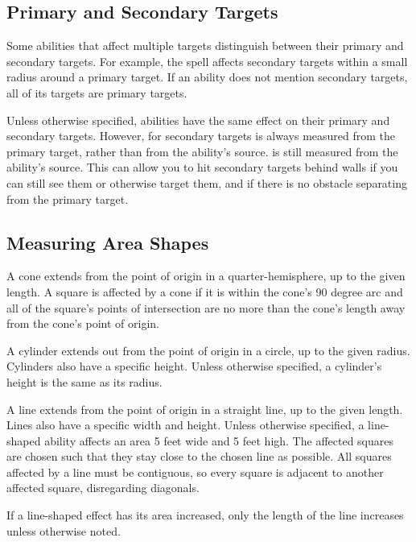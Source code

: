   \subsection{Primary and Secondary Targets}\label{Primary and Secondary Targets}
    Some abilities that affect multiple targets distinguish between their primary and secondary targets.
    For example, the  spell affects secondary targets within a small radius around a primary target.
    If an ability does not mention secondary targets, all of its targets are primary targets.

    Unless otherwise specified, abilities have the same effect on their primary and secondary targets.
    However,  for secondary targets is always measured from the primary target, rather than from the ability's source.
     is still measured from the ability's source.
    This can allow you to hit secondary targets behind walls if you can still see them or otherwise target them, and if there is no obstacle separating from the primary target.

  \subsection{Measuring Area Shapes}\label{Area Shapes}

     A cone extends from the point of origin in a quarter-hemisphere, up to the given length.
    A square is affected by a cone if it is within the cone's 90 degree arc and all of the square's points of intersection are no more than the cone's length away from the cone's point of origin.

     A cylinder extends out from the point of origin in a circle, up to the given radius.
    Cylinders also have a specific height.
    Unless otherwise specified, a cylinder's height is the same as its radius.

     A line extends from the point of origin in a straight line, up to the given length.
    Lines also have a specific width and height.
    Unless otherwise specified, a line-shaped ability affects an area 5 feet wide and 5 feet high.
    The affected squares are chosen such that they stay close to the chosen line as possible.
    All squares affected by a line must be contiguous, so every square is adjacent to another affected square, disregarding diagonals.

    If a line-shaped effect has its area increased, only the length of the line increases unless otherwise noted.

